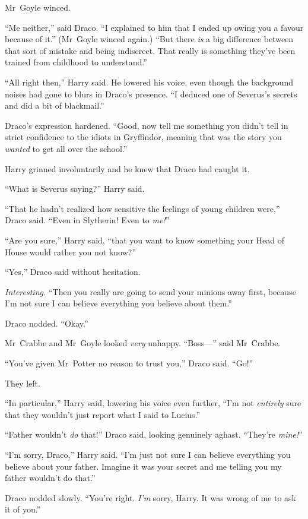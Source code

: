 Mr~Goyle winced.

“Me neither,” said Draco. “I explained to him that I ended up owing you a favour because of it.” (Mr~Goyle winced again.) “But there \emph{is} a big difference between that sort of mistake and being indiscreet. That really is something they’ve been trained from childhood to understand.”

“All right then,” Harry said. He lowered his voice, even though the background noises had gone to blurs in Draco’s presence. “I deduced one of Severus’s secrets and did a bit of blackmail.”

Draco’s expression hardened. “Good, now tell me something you didn’t tell in strict confidence to the idiots in Gryffindor, meaning that was the story you \emph{wanted} to get all over the school.”

Harry grinned involuntarily and he knew that Draco had caught it.

“What is Severus saying?” Harry said.

“That he hadn’t realized how sensitive the feelings of young children were,” Draco said. “Even in Slytherin! Even to \emph{me!}”

“Are you sure,” Harry said, “that you want to know something your Head of House would rather you not know?”

“Yes,” Draco said without hesitation.

\emph{Interesting.} “Then you really are going to send your minions away first, because I’m not sure I can believe everything you believe about them.”

Draco nodded. “Okay.”

Mr~Crabbe and Mr~Goyle looked \emph{very} unhappy. “Boss—” said Mr~Crabbe.

“You’ve given Mr~Potter no reason to trust you,” Draco said. “Go!”

They left.

“In particular,” Harry said, lowering his voice even further, “I’m not \emph{entirely} sure that they wouldn’t just report what I said to Lucius.”

“Father wouldn’t \emph{do} that!” Draco said, looking genuinely aghast. “They’re \emph{mine!}”

“I’m sorry, Draco,” Harry said. “I’m just not sure I can believe everything you believe about your father. Imagine it was your secret and me telling you my father wouldn’t do that.”

Draco nodded slowly. “You’re right. \emph{I’m} sorry, Harry. It was wrong of me to ask it of you.”

